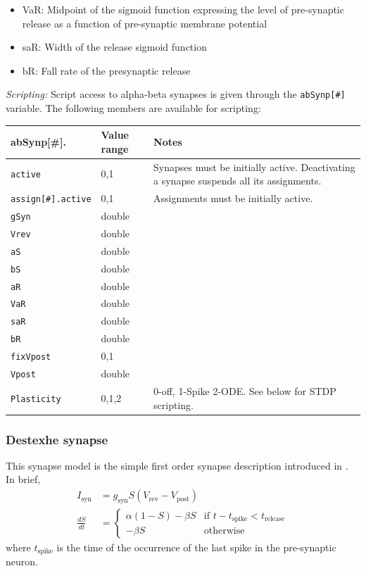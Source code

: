 \documentclass{article}
\begin{document}
\begin{itemize}
\item VaR: Midpoint of the sigmoid function expressing the level of
  pre-synaptic release as a function of pre-synaptic membrane
  potential
\item saR: Width of the release sigmoid function
\item bR: Fall rate of the presynaptic release
\end{itemize}

\noindent
\emph{Scripting:} Script access to alpha-beta synapses is given through the \texttt{abSynp[\#]} variable.
The following members are available for scripting: \\
\begin{tabularx}{\linewidth}{|ll|X|}
	\hline
	{\bf abSynp[\#].\textvisiblespace} & {\bf Value range} & {\bf Notes} \\
	\hline
	\texttt{active} & 0,1 & Synapses must be initially active. Deactivating a synapse suspends all
	its assignments. \\
	\texttt{assign[\#].active} & 0,1 & Assignments must be initially active. \\
	\texttt{gSyn} & double & \\
	\texttt{Vrev} & double & \\
	\texttt{aS} & double & \\
	\texttt{bS} & double & \\
	\texttt{aR} & double & \\
	\texttt{VaR} & double & \\
	\texttt{saR} & double & \\
	\texttt{bR} & double & \\
	\texttt{fixVpost} & 0,1 & \\
	\texttt{Vpost} & double & \\
	\texttt{Plasticity} & 0,1,2 & 0-off, 1-Spike 2-ODE. See below for STDP scripting. \\
	\hline
\end{tabularx}


\subsubsection{Destexhe synapse}
This synapse model is the simple first order synapse description
introduced in \cite{Destexhe1994}. In brief,
\begin{align}
I_{\text{syn}}&= g_{\text{syn}} S (V_{\text{rev}} -
V_{\text{post}}) \\
\frac{dS}{dt} &= \left\{ \begin{array}{ll} 
  \alpha (1-S) - \beta S & \text{if } t-t_{\text{spike}} < t_{\text{release}} \\
- \beta S & \text{otherwise} 
\end{array} \right.
\end{align}
where $t_{\text{spike}}$ is the time of the occurrence of the last
spike in the pre-synaptic neuron.
\end{document}

